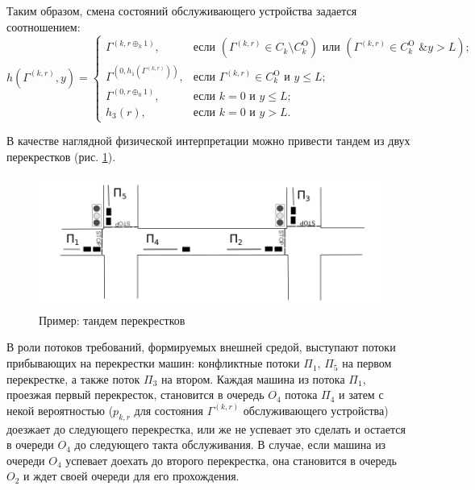 \documentclass[12pt]{extarticle}
\theoremstyle{theorem}
\theoremstyle{remark}
\begin{document}
Таким образом, смена состояний обслуживающего устройства задается соотношением:
\begin{equation}
h(\Gamma^{(k,r)},y) = 
\begin{cases}
\Gamma^{(k,r \oplus_k 1)},&  \text{если } (\Gamma^{(k,r)}\in C_k\setminus C_k^{\mathrm{O}}) \text{ или } (\Gamma^{(k,r)}\in C_k^{\mathrm{O}} \text{ \& } y>L);\\
\Gamma^{(0,h_1(\Gamma^{(k,r)}))},&  \text{если } \Gamma^{(k,r)}\in C_k^{\mathrm{O}} \text{ и } y\leqslant L;\\
\Gamma^{(0,r \oplus_0 1)},&  \text{если } k=0 \text{ и } y\leqslant L;\\
h_3(r),&  \text{если } k=0 \text{ и } y > L.
\end{cases}
\label{hLaw}
\end{equation}

В качестве наглядной физической интерпретации можно привести тандем из двух перекрестков (рис. \ref{crossroads}).
\begin{figure}[t]
\includegraphics[scale=0.41]{Crossroads_grayscale.png}
\caption{Пример: тандем перекрестков}
\label{crossroads}
\end{figure}
В роли потоков требований, формируемых внешней средой, выступают потоки прибывающих на перекрестки машин: конфликтные потоки $\Pi_1$, $\Pi_5$ на первом перекрестке, а также поток $\Pi_3$ на втором. Каждая машина из потока $\Pi_1$, проезжая первый перекресток, становится в очередь $O_4$ потока $\Pi_4$ и затем с некой вероятностью ($p_{k,r}$ для состояния $\Gamma^{(k,r)}$ обслуживающего устройства) доезжает до следующего перекрестка, или же не успевает это сделать и остается в очереди $O_4$ до следующего такта обслуживания. В случае, если машина из очереди $O_4$ успевает доехать до второго перекрестка, она становится в очередь $O_2$ и ждет своей очереди для его прохождения.
\end{document}

